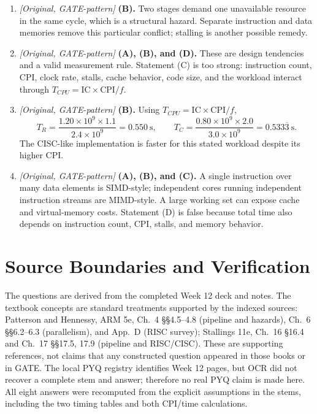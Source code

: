 \documentclass[11pt]{article}
\begin{document}
\begin{enumerate}
\item[\textbf{Q5}] \textit{[Original, GATE-pattern]} \textbf{(B).} Two
stages demand one unavailable resource in the same cycle, which is a
structural hazard. Separate instruction and data memories remove this
particular conflict; stalling is another possible remedy.

\item[\textbf{Q6}] \textit{[Original, GATE-pattern]} \textbf{(A), (B), and
(D).} These are design tendencies and a valid measurement rule. Statement (C)
is too strong: instruction count, CPI, clock rate, stalls, cache behavior,
code size, and the workload interact through
$T_{CPU}=\mathrm{IC}\times\mathrm{CPI}/f$.

\item[\textbf{Q7}] \textit{[Original, GATE-pattern]} \textbf{(B).} Using
$T_{CPU}=\mathrm{IC}\times\mathrm{CPI}/f$,
\[
  T_R=\frac{1.20\times10^9\times1.1}{2.4\times10^9}=0.550~\mathrm{s},
  \qquad
  T_C=\frac{0.80\times10^9\times2.0}{3.0\times10^9}
      =0.533\overline{3}~\mathrm{s}.
\]
The CISC-like implementation is faster for this stated workload despite its
higher CPI.

\item[\textbf{Q8}] \textit{[Original, GATE-pattern]} \textbf{(A), (B), and
(C).} A single instruction over many data elements is SIMD-style; independent
cores running independent instruction streams are MIMD-style. A large working
set can expose cache and virtual-memory costs. Statement (D) is false because
total time also depends on instruction count, CPI, stalls, and memory behavior.
\end{enumerate}

\section*{Source Boundaries and Verification}
The questions are derived from the completed Week 12 deck and notes. The
textbook concepts are standard treatments supported by the indexed sources:
Patterson and Hennessy, ARM 5e, Ch.~4 §§4.5--4.8 (pipeline and hazards),
Ch.~6 §§6.2--6.3 (parallelism), and App.~D (RISC survey); Stallings 11e,
Ch.~16 §16.4 and Ch.~17 §§17.5, 17.9 (pipeline and RISC/CISC). These are
supporting references, not claims that any constructed question appeared in
those books or in GATE. The local PYQ registry identifies Week 12 pages, but
OCR did not recover a complete stem and answer; therefore no real PYQ claim is
made here. All eight answers were recomputed from the explicit assumptions in
the stems, including the two timing tables and both CPI/time calculations.
\end{document}
